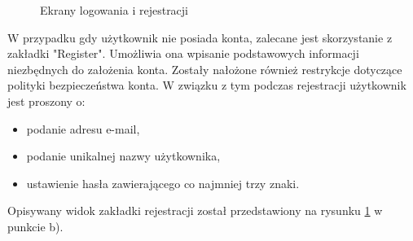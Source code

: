 {\begin{figure}[h]
	\centering
	\quad
	\caption{Ekrany logowania i rejestracji}
	\label{fig:registerpage}
\end{figure}

W przypadku gdy użytkownik nie posiada konta, zalecane jest skorzystanie z zakładki "Register". Umożliwia ona wpisanie podstawowych informacji niezbędnych do założenia konta. Zostały nałożone również restrykcje dotyczące polityki bezpieczeństwa konta. W związku z tym podczas rejestracji użytkownik jest proszony o:
\begin{itemize}[noitemsep]
	\item podanie adresu e-mail,
	\item podanie unikalnej nazwy użytkownika,
	\item ustawienie hasła zawierającego co najmniej trzy znaki.
\end{itemize} 
}
Opisywany widok zakładki rejestracji został przedstawiony na rysunku \ref{fig:registerpage} w punkcie b).
\newpage
